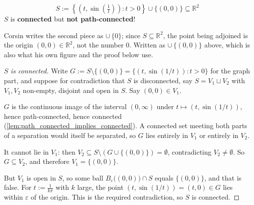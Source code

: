 \begin{example}
\label{ex:topologists_sine_curve}
\[S := \left\{\left(t, \sin\left(\tfrac{1}{t}\right)\right) : t > 0\right\} \cup \{(0,0)\} \subseteq \mathbb{R}^2\]
$S$ is \textbf{connected} but \textbf{not path-connected}!
\end{example}

\begin{ainote}
Corsin writes the second piece as $\cup\,\{0\}$; since $S \subseteq \mathbb{R}^2$, the point
being adjoined is the origin $(0,0) \in \mathbb{R}^2$, not the number $0$. Written as
$\cup\,\{(0,0)\}$ above, which is also what his own figure and the proof below use.
\end{ainote}

\begin{center}
\end{center}

\begin{proof}[$S$ is connected]
Write $G := S \setminus \{(0,0)\} = \{(t,\sin(1/t)) : t>0\}$ for the graph part, and suppose for
contradiction that $S$ is disconnected, say $S = V_1 \sqcup V_2$ with $V_1,V_2$ non-empty,
disjoint and open in $S$. Say $(0,0) \in V_1$.

$G$ is the continuous image of the interval $(0,\infty)$ under
$t \mapsto (t,\sin(1/t))$, hence path-connected, hence connected
(\cref{lem:path_connected_implies_connected}). A connected set meeting both parts of a
separation would itself be separated, so $G$ lies entirely in $V_1$ or entirely in $V_2$.

It cannot lie in $V_1$: then $V_2 \subseteq S \setminus (G \cup \{(0,0)\}) = \emptyset$,
contradicting $V_2 \neq \emptyset$. So $G \subseteq V_2$, and therefore
$V_1 = \{(0,0)\}$.

But $V_1$ is open in $S$, so some ball $B_\varepsilon\big((0,0)\big) \cap S$ equals
$\{(0,0)\}$, and that is false. For $t := \tfrac{1}{k\pi}$ with $k$ large, the point
$(t,\sin(1/t)) = (t,0) \in G$ lies within $\varepsilon$ of the origin. This is the required
contradiction, so $S$ is connected.
\end{proof}


